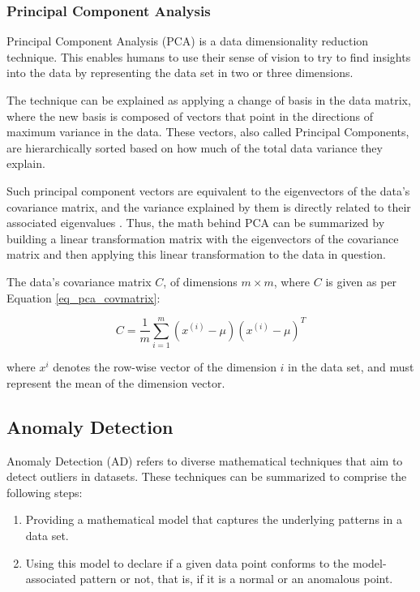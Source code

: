 \documentclass[conference]{IEEEtran}
\begin{document}
\subsubsection{Principal Component Analysis}

Principal Component Analysis (PCA) is a data dimensionality reduction technique. This enables humans to use their sense of vision to try to find insights into the data by representing the data set in two or three dimensions.

The technique can be explained as applying a change of basis in the data matrix, where the new basis is composed of vectors that point in the directions of maximum variance in the data. These vectors, also called Principal Components, are hierarchically sorted based on how much of the total data variance they explain.

Such principal component vectors are equivalent to the eigenvectors of the data's covariance matrix, and the variance explained by them is directly related to their associated eigenvalues \cite{b7}. Thus, the math behind PCA can be summarized by building a linear transformation matrix with the eigenvectors of the covariance matrix and then applying this linear transformation to the data in question.

The data's covariance matrix $C$, of dimensions $m \times m$, where $C$ is given as per Equation \ref{eq_pca_covmatrix}:

\begin{equation}
	\label{eq_pca_covmatrix}
	C=\frac{1}{m}\sum_{i = 1}^{m}(x^{(i)}-\mu)(x^{(i)}-\mu)^{T}   
\end{equation}

where $x^{i}$ denotes the row-wise vector of the dimension $i$ in the data set, and must represent the mean of the dimension vector. 

\subsection{Anomaly Detection}
\label{sec_anomaly_detection}
Anomaly Detection (AD) refers to diverse mathematical techniques that aim to detect outliers in datasets. These techniques can be summarized to comprise the following steps: 

\begin{enumerate}
	\item Providing a mathematical model that captures the underlying patterns in a data set.
	\item Using this model to declare if a given data point conforms to the model-associated pattern or not, that is, if it is a normal or an anomalous point.
\end{enumerate}
\end{document}
